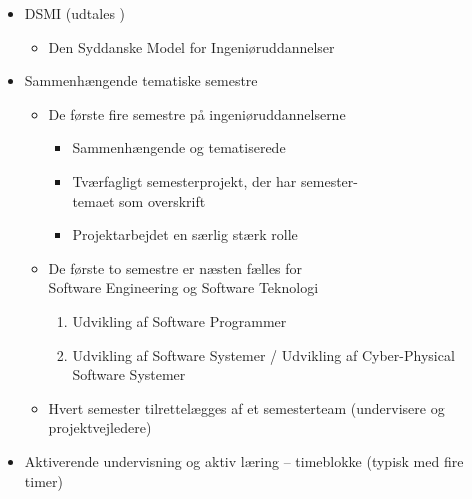 \documentclass[t, aspectratio=169]{beamer}
\newcommand{\quoted}[1]{\textsl{\say{#1}}}
\begin{document}
\begin{frame}[fragile]
  \vspace{0mm}
  \begin{itemize}
    \pause
    \item DSMI (udtales \quoted{dæsmi})
      \begin{itemize}
        \item Den Syddanske Model for Ingeniøruddannelser
      \end{itemize}
    \pause
    \item Sammenhængende tematiske semestre
      \begin{itemize}
        \item De første fire semestre på ingeniøruddannelserne
          \begin{itemize}
            \item Sammenhængende og tematiserede
            \item Tværfagligt semesterprojekt, der har semester-\\temaet som overskrift
            \item Projektarbejdet en særlig stærk rolle
          \end{itemize}
        \item De første to semestre er næsten fælles for\\Software Engineering og Software Teknologi
          \begin{enumerate}
            \item Udvikling af Software Programmer
            \item Udvikling af Software Systemer / Udvikling af Cyber-Physical Software Systemer
          \end{enumerate}
        \item Hvert semester tilrettelægges af et semesterteam (undervisere og projektvejledere)
      \end{itemize}
    \pause
    \item Aktiverende undervisning og aktiv læring – timeblokke (typisk med fire timer)
  \end{itemize}
\end{frame}
\end{document}
